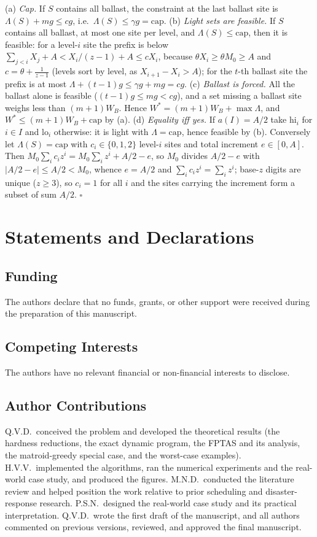 \documentclass[pdflatex,sn-mathphys-ay]{sn-jnl}
\theoremstyle{thmstyleone}
\theoremstyle{thmstyletwo}
\theoremstyle{thmstylethree}
\begin{document}
\begin{appendices}
(a) \emph{Cap.} If $S$ contains all ballast, the constraint at the last
ballast site is $\Lambda(S)+mg\le cg$, i.e.\ $\Lambda(S)\le\gamma g=\mathrm{cap}$.
(b) \emph{Light sets are feasible.} If $S$ contains all ballast, at most
one site per level, and $\Lambda(S)\le\mathrm{cap}$, then it is feasible:
for a level-$i$ site the prefix is below
$\sum_{j<i}X_j+A<X_i/(z-1)+A\le cX_i$, because $\theta X_i\ge\theta M_0\ge A$
and $c=\theta+\frac1{z-1}$ (levels sort by level, as $X_{i+1}-X_i>A$); for
the $t$-th ballast site the prefix is at most $\Lambda+(t-1)g\le\gamma g+mg=cg$.
(c) \emph{Ballast is forced.} All the ballast alone is feasible
($(t-1)g\le mg<cg$), and a set missing a ballast site weighs less than
$(m+1)W_B$. Hence $W^\ast=(m+1)W_B+\max\Lambda$, and $W^\ast\le(m+1)W_B+\mathrm{cap}$
by (a). (d) \emph{Equality iff yes.} If $a(I)=A/2$ take $\mathrm{hi}_i$ for
$i\in I$ and $\mathrm{lo}_i$ otherwise: it is light with
$\Lambda=\mathrm{cap}$, hence feasible by (b). Conversely let
$\Lambda(S)=\mathrm{cap}$ with $c_i\in\{0,1,2\}$ level-$i$ sites and
total increment $e\in[0,A]$. Then $M_0\sum_ic_iz^i=M_0\sum_iz^i+A/2-e$, so
$M_0$ divides $A/2-e$ with $|A/2-e|\le A/2<M_0$, whence $e=A/2$ and
$\sum_ic_iz^i=\sum_iz^i$; base-$z$ digits are unique ($z\ge3$), so
$c_i=1$ for all $i$ and the sites carrying the increment form a subset of
sum $A/2$. \hfill$\square$

\end{appendices}

\backmatter

\section*{Statements and Declarations}

\subsection*{Funding}
The authors declare that no funds, grants, or other support were
received during the preparation of this manuscript.

\subsection*{Competing Interests}
The authors have no relevant financial or non-financial interests to
disclose.

\subsection*{Author Contributions}
Q.V.D.\ conceived the problem and developed the theoretical results
(the hardness reductions, the exact dynamic program, the FPTAS and its
analysis, the matroid-greedy special case, and the worst-case examples).
H.V.V.\ implemented the algorithms, ran the numerical experiments and
the real-world case study, and produced the figures. M.N.D.\ conducted
the literature review and helped position the work relative to prior
scheduling and disaster-response research. P.S.N.\ designed the
real-world case study and its practical interpretation. Q.V.D.\ wrote
the first draft of the manuscript, and all authors commented on
previous versions, reviewed, and approved the final manuscript.
\end{document}
